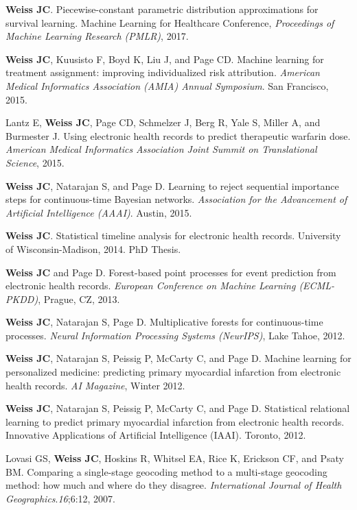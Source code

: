 \begin{bibsection}
\item  \textbf{Weiss JC}. Piecewise-constant parametric distribution approximations for survival learning. Machine Learning for Healthcare Conference, \emph{Proceedings of Machine Learning Research (PMLR)}, 2017.

\item  \textbf{Weiss JC}, Kuusisto F, Boyd K, Liu J, and Page CD. Machine learning for treatment assignment: improving individualized risk attribution. \textit{American Medical Informatics Association (AMIA) Annual Symposium}. San Francisco, 2015.

\item  Lantz E, \textbf{Weiss JC}, Page CD, Schmelzer J, Berg R, Yale S, Miller A, and Burmester J. Using electronic health records to predict therapeutic warfarin dose. \textit{American Medical Informatics Association Joint Summit on Translational Science}, 2015.

\item  \textbf{Weiss JC}, Natarajan S, and Page D. Learning to reject sequential importance steps for continuous-time Bayesian networks. \textit{Association for the Advancement of Artificial Intelligence (AAAI)}. Austin, 2015.

\item  \textbf{Weiss JC}. Statistical timeline analysis for electronic health records. University of Wisconsin-Madison, 2014. PhD Thesis.

\item  \textbf{Weiss JC} and Page D. Forest-based point processes for event prediction from electronic health records. \textit{European Conference on Machine Learning (ECML-PKDD)}, Prague, CZ, 2013.

\item  \textbf{Weiss JC}, Natarajan S, Page D. Multiplicative forests for continuous-time processes. \textit{Neural Information Processing Systems (NeurIPS)}, Lake Tahoe, 2012.

\item  \textbf{Weiss JC}, Natarajan S, Peissig P, McCarty C, and Page D. Machine learning for personalized medicine: predicting primary myocardial infarction from electronic health records. \textit{AI Magazine}, Winter 2012.

\item  \textbf{Weiss JC}, Natarajan S, Peissig P, McCarty C, and Page D. Statistical relational learning to predict primary myocardial infarction from electronic health records. Innovative Applications of Artificial Intelligence (IAAI). Toronto, 2012.

\item  Lovasi GS, \textbf{Weiss JC}, Hoskins R, Whitsel EA, Rice K, Erickson CF, and Psaty BM. Comparing a single-stage geocoding method to a multi-stage geocoding method: how much and where do they disagree. \textit{International Journal of Health Geographics}.\textit{16};6:12, 2007.
  
\end{bibsection}

